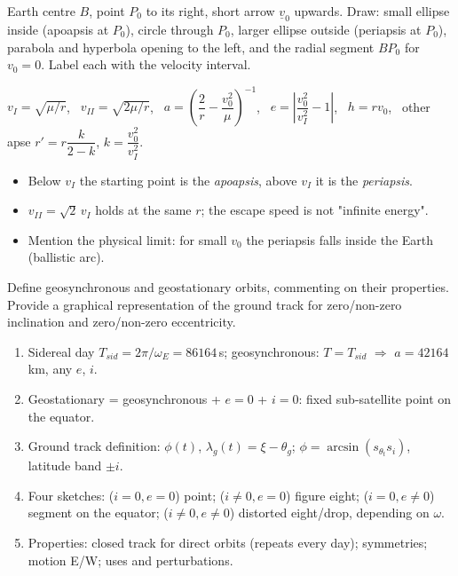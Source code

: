 \begin{fig2draw}
Earth centre $B$, point $P_0$ to its right, short arrow $\underline v_0$ upwards. Draw: small ellipse inside (apoapsis at $P_0$),
circle through $P_0$, larger ellipse outside (periapsis at $P_0$), parabola and hyperbola opening to the left, and
the radial segment $BP_0$ for $v_0=0$. Label each with the velocity interval.
\end{fig2draw}

\begin{keyf}
$v_I=\sqrt{\mu/r}$, \ $v_{II}=\sqrt{2\mu/r}$, \ $a=\left(\dfrac2r-\dfrac{v_0^2}{\mu}\right)^{-1}$, \ $e=\left|\dfrac{v_0^2}{v_I^2}-1\right|$,
\ $h=rv_0$, \ other apse $r'=r\dfrac{k}{2-k}$, $k=\dfrac{v_0^2}{v_I^2}$.
\end{keyf}

\pitfalls
\begin{itemize}
\item Below $v_I$ the starting point is the \emph{apoapsis}, above $v_I$ it is the \emph{periapsis}.
\item $v_{II}=\sqrt2\,v_I$ holds at the same $r$; the escape speed is not "infinite energy".
\item Mention the physical limit: for small $v_0$ the periapsis falls inside the Earth (ballistic arc).
\end{itemize}


\begin{qbox}
Define geosynchronous and geostationary orbits, commenting on their properties. Provide a graphical representation of the
ground track for zero/non-zero inclination and zero/non-zero eccentricity.
\end{qbox}

\begin{outline}
\begin{enumerate}
\item Sidereal day $T_{sid}=2\pi/\omega_E=86164$\,s; geosynchronous: $T=T_{sid}$ $\Rightarrow$ $a=42164$\,km, any $e$, $i$.
\item Geostationary = geosynchronous + $e=0$ + $i=0$: fixed sub-satellite point on the equator.
\item Ground track definition: $\phi(t)$, $\lambda_g(t)=\xi-\theta_g$; $\phi=\arcsin(s_{\theta_t}s_i)$, latitude band $\pm i$.
\item Four sketches: ($i=0,e=0$) point; ($i\neq0,e=0$) figure eight; ($i=0,e\neq0$) segment on the equator;
($i\neq0,e\neq0$) distorted eight/drop, depending on $\omega$.
\item Properties: closed track for direct orbits (repeats every day); symmetries; motion E/W; uses and perturbations.
\end{enumerate}
\end{outline}

